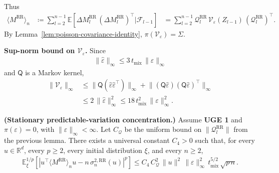 Thus
\begin{equation}
\begin{aligned}
\langle M^{\text{RR}} \rangle_n
  &\coloneqq \sum_{l = 2}^{n - 1}
      \mathbb{E}[\Delta M_l^{\text{RR}} \, (\Delta M_l^{\text{RR}})^\top | \mathcal{F}_{l - 1}]
  &= \sum_{l = 2}^{n - 1}
      \mathcal{Q}_l^{\text{RR}} \, \mathcal{V}_{\varepsilon}(Z_{l - 1})
      \, (\mathcal{Q}_l^{\text{RR}})^\top.
\end{aligned}
\label{eq:M-RR-bracket}
\end{equation}
By Lemma~\ref{lem:poisson-covariance-identity}, \(\pi(\mathcal{V}_{\varepsilon}) = \Sigma\).

\textbf{Sup-norm bound on \(\mathcal{V}_{\varepsilon}\).} Since
\begin{equation}
\begin{aligned}
\lVert  \widehat{\varepsilon}  \rVert_\infty \le 3 \, t_{\text{mix}} \, \lVert  \varepsilon  \rVert_\infty
\end{aligned}
\end{equation}
and \(\mathsf{Q}\) is a Markov kernel,
\begin{equation}
\begin{aligned}
\lVert  \mathcal{V}_{\varepsilon}  \rVert_\infty
  &\le \lVert  \mathsf{Q}(\widehat{\varepsilon} \widehat{\varepsilon}^\top)  \rVert_\infty
   + \lVert  (\mathsf{Q} \widehat{\varepsilon})(\mathsf{Q} \widehat{\varepsilon})^\top  \rVert_\infty \\
  &\le 2 \, \lVert  \widehat{\varepsilon}  \rVert_\infty^2
   \le 18 \, t_{\text{mix}}^2 \, \lVert  \varepsilon  \rVert_\infty^2.
\end{aligned}
\label{eq:bar-eps-sup}
\end{equation}

\begin{lemma}\label{lem:M-RR-bracket-conc}
  \textbf{(Stationary predictable-variation concentration.)}
  Assume \textbf{UGE 1} and \(\pi(\varepsilon) = 0\), with \(\lVert  \varepsilon  \rVert_\infty < \infty\).
  Let \(C_{\mathcal{Q}}\) be the uniform bound on \(\lVert  \mathcal{Q}_l^{\text{RR}}  \rVert\) from the
  previous lemma. There exists a universal constant \(C_4 > 0\) such that, for
  every \(u \in \mathbb{R}^d\), every \(p \ge 2\), every initial distribution \(\xi\), and every
  \(n \ge 2\),
\begin{equation}
\begin{aligned}
  \mathbb{E}_\xi^{1 / p} \left[
    | u^\top \langle M^{\text{RR}} \rangle_n u - n \, \sigma_n^{2, \text{RR}}(u) |^p
  \right]
    \le C_4 \, C_{\mathcal{Q}}^2 \, \lVert  u  \rVert^2 \, \lVert  \varepsilon  \rVert_\infty^2
       \, t_{\text{mix}}^{5 / 2} \, \sqrt{p \, n}.
\end{aligned}
\label{eq:M-RR-conc}
\end{equation}
\end{lemma}

